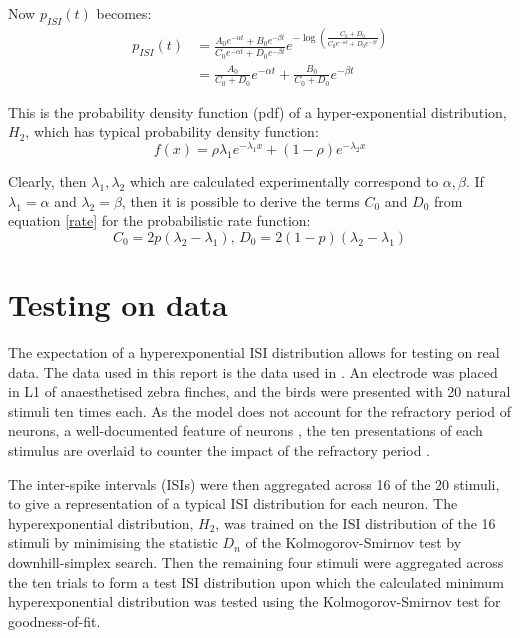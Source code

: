 Now $p_{ISI}(t)$ becomes:
\begin{equation}
\begin{split}
p_{ISI}(t) &= \frac{A_0e^{-\alpha t}+B_0e^{-\beta t}}{C_0e^{-\alpha t} + D_0e^{-\beta t}}e^{-\log \left( \frac{C_0+D_0}{C_0e^{-\alpha t}+D_0e^{-\beta t}}\right)}\\
&= \frac{A_0}{C_0+D_0}e^{-\alpha t} + \frac{B_0}{C_0+D_0}e^{-\beta t}
\end{split}
\end{equation}

This is the probability density function (pdf) of a hyper-exponential distribution, $H_2$, which has typical probability density function:
\begin{equation}
f(x) = \rho\lambda_1 e^{-\lambda_1 x} + (1-\rho) e^{-\lambda_2 x}
\end{equation}

Clearly, then $\lambda_1, \lambda_2$ which are calculated experimentally correspond to $\alpha,\beta$.  If $\lambda_1 = \alpha$ and $\lambda_2 = \beta$, then it is possible to derive the terms $C_0$ and $D_0$ from equation \ref{rate} for the probabilistic rate function:
\begin{equation}
C_0 = 2p(\lambda_2-\lambda_1), \, D_0 = 2(1-p)(\lambda_2-\lambda_1)
\end{equation}


\section{Testing on data}
The expectation of a hyperexponential ISI distribution allows for testing on real data.  The data used in this report is the data used in \citep{NarayanEtAl2006b}.  An electrode was placed in L1 of anaesthetised zebra finches, and the birds were presented with 20 natural stimuli ten times each.  As the model does not account for the refractory period of neurons, a well-documented feature of neurons \citep{OlshausenField2004a} , the ten presentations of each stimulus are overlaid to counter the impact of the refractory period \citep{BerryMeister1998a}. 

The inter-spike intervals (ISIs) were then aggregated across 16 of the 20 stimuli, to give a representation of a typical ISI distribution for each neuron.  The hyperexponential distribution, $H_2$, was trained on the ISI distribution of the 16 stimuli by minimising the statistic $D_n$ of the Kolmogorov-Smirnov test \citep{Massey1951a} by downhill-simplex search.  Then the remaining four stimuli were aggregated across the ten trials to form a test ISI distribution upon which the calculated minimum hyperexponential distribution was tested using the Kolmogorov-Smirnov test for goodness-of-fit.

